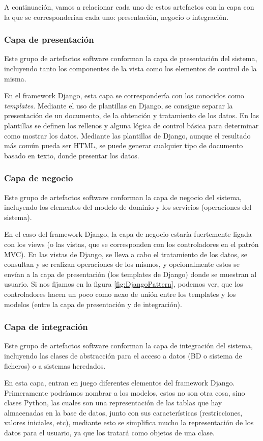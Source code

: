 A continuación, vamos a relacionar cada uno de estos artefactos con la capa con
la que se corresponderían cada uno: presentación, negocio o integración.

\subsubsection{Capa de presentación}
Este grupo de artefactos software conforman la capa de presentación del sistema,
incluyendo tanto los componentes de la vista como los elementos de control de la
misma.

En el framework Django, esta capa se correspondería con los conocidos como
\textit{templates}. Mediante el uso de plantillas en Django, se consigue
separar la presentación de un documento, de la obtención y tratamiento de los
datos. En las plantillas se definen los rellenos y alguna lógica de control
básica para determinar como mostrar los datos. Mediante las plantillas de Django,
aunque el resultado más común pueda ser HTML, se puede generar cualquier tipo de
documento basado en texto, donde presentar los datos.
\subsubsection{Capa de negocio}
Este grupo de artefactos software conforman la capa de negocio del sistema,
incluyendo los elementos del modelo de dominio y los servicios (operaciones del
sistema).

En el caso del framework Django, la capa de negocio estaría fuertemente ligada
con los views (o las vistas, que se corresponden con los controladores en el
patrón MVC). En las vistas de Django, se lleva a cabo el tratamiento de los
datos, se consultan y se realizan operaciones de los mismos, y opcionalmente
estos se envían a la capa de presentación (los templates de Django) donde se
muestran al usuario. Si nos fijamos en la figura \ref{fig:DjangoPattern},
podemos ver, que los controladores hacen un poco como nexo de unión entre los
templates y los modelos (entre la capa de presentación y de integración).
\subsubsection{Capa de integración}
Este grupo de artefactos software conforman la capa de integración del sistema,
incluyendo las clases de abstracción para el acceso a datos (BD o sistema de
ficheros) o a sistemas heredados.

En esta capa, entran en juego diferentes elementos del framework Django.
Primeramente podríamos nombrar a los modelos, estos no son otra cosa, sino
clases Python, las cuales son una representación de las tablas que hay
almacenadas en la base de datos, junto con sus características (restricciones,
valores iniciales, etc), mediante esto se simplifica mucho la representación de
los datos para el usuario, ya que los tratará como objetos de una clase.

